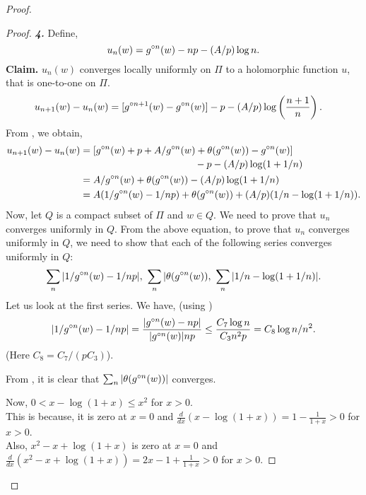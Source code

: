\begin{proof}
\begin{proof}
\noindent\textbf{\emph{4.}} Define, \[
	u_n(w)=\gog[n](w)-np-(A /p)\log n
.\] 
\noindent\textbf{Claim.} \( u_n(w) \) converges locally uniformly on \( \Pi \) to a holomorphic function \( u \), that is one-to-one
on \( \Pi \).
\begin{align*}
	u_{n+1}(w)-u_n(w)&=[\gog[n+1](w)-\gog[n](w)]-p-(A /p)\log \left(\frac{n+1}{n}\right)
.\end{align*}
From , we obtain, 
\begin{align*}
	u_{n+1}(w)-u_n(w) &= \!\begin{multlined}[t]
							[\gog[n](w)+p+A /\gog[n](w)+\theta(\gog[n](w))-\gog[n](w)]\\
							 -p-(A /p)\log (1+1 /n)
						 \end{multlined}\\
					  &= A /\gog[n](w)+\theta (\gog[n](w))- (A /p)\log (1+1 /n)\\
					  &= A(1 /\gog[n](w)-1 /np)+\theta (\gog[n](w))+(A /p)(1 /n-\log (1+1 /n))
.\end{align*}
Now, let \( Q \) is a compact subset of \( \Pi \) and \( w\in Q \).
We need to prove that \( u_n \) converges uniformly in \( Q \). From the above equation, to prove
that \( u_n \) converges uniformly in \( Q \), we need to show that each of the following series converges uniformly in \( Q \):\[
	\sum_n |1 /\gog[n](w)-1 /np|,\,\,\sum_n|\theta (\gog[n](w)),\,\,\sum_n|1 /n-\log (1+1 /n)|
.\] 
Let us look at the first series. We have, (using ) \[
	|1 /\gog[n](w)-1 /np|=\frac{|\gog[n](w)-np|}{|\gog[n](w)|np}\le \frac{C_7 \log n}{C_3 n^2 p}=C_8\log n /n^2
.\] 
(Here \( C_8=C_7 /(pC_3) \)).

\noindent From , it is clear that \( \sum_n |\theta(\gog[n](w))| \) converges.

\noindent Now, \( 0<x-\log (1+x)\le   x^2 \) for \( x>0 \). \\
This is because, it is zero at \( x=0 \)
and \( \frac{d}{dx}(x-\log (1+x))=1-\frac{1}{1+x}>0 \) for \( x>0 \).\\
Also, \( x^2-x+\log (1+x) \) is zero at \( x=0 \) 
and \( \frac{d}{dx}(x^2-x+\log (1+x))=2x-1+\frac{1}{1+x}>0 \) for \( x>0 \).


\end{proof}
\end{proof}
